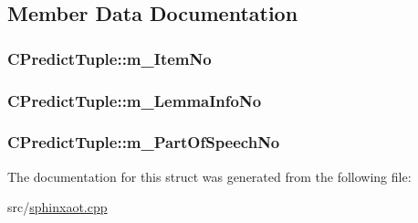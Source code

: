 \subsection{Member Data Documentation}
\hypertarget{structCPredictTuple_a2889159389cf2c0a7fdc2306dab9d0d3}{
\subsubsection[{m\-\_\-\-Item\-No}]{ C\-Predict\-Tuple\-::m\-\_\-\-Item\-No}}\label{structCPredictTuple_a2889159389cf2c0a7fdc2306dab9d0d3}
\hypertarget{structCPredictTuple_aad6320cb77c45c7c2531c0a7303a5fc4}{
\subsubsection[{m\-\_\-\-Lemma\-Info\-No}]{ C\-Predict\-Tuple\-::m\-\_\-\-Lemma\-Info\-No}}\label{structCPredictTuple_aad6320cb77c45c7c2531c0a7303a5fc4}
\hypertarget{structCPredictTuple_ad215007814a0444b111526131fb5c294}{
\subsubsection[{m\-\_\-\-Part\-Of\-Speech\-No}]{ C\-Predict\-Tuple\-::m\-\_\-\-Part\-Of\-Speech\-No}}\label{structCPredictTuple_ad215007814a0444b111526131fb5c294}


The documentation for this struct was generated from the following file\-:\begin{DoxyCompactItemize}
\item 
src/\hyperlink{sphinxaot_8cpp}{sphinxaot.\-cpp}\end{DoxyCompactItemize}
